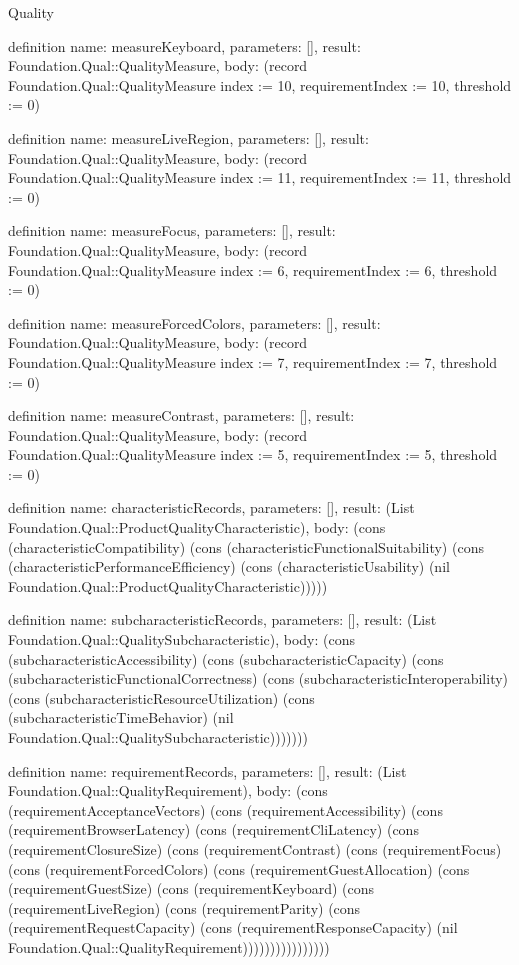 \begin{lexlean}{Quality}
\begin{semanticmodule}
definition{
  name: measureKeyboard,
  parameters: [],
  result: Foundation.Qual::QualityMeasure,
  body: (record Foundation.Qual::QualityMeasure {index := 10, requirementIndex := 10, threshold := 0})
}

definition{
  name: measureLiveRegion,
  parameters: [],
  result: Foundation.Qual::QualityMeasure,
  body: (record Foundation.Qual::QualityMeasure {index := 11, requirementIndex := 11, threshold := 0})
}

definition{
  name: measureFocus,
  parameters: [],
  result: Foundation.Qual::QualityMeasure,
  body: (record Foundation.Qual::QualityMeasure {index := 6, requirementIndex := 6, threshold := 0})
}

definition{
  name: measureForcedColors,
  parameters: [],
  result: Foundation.Qual::QualityMeasure,
  body: (record Foundation.Qual::QualityMeasure {index := 7, requirementIndex := 7, threshold := 0})
}

definition{
  name: measureContrast,
  parameters: [],
  result: Foundation.Qual::QualityMeasure,
  body: (record Foundation.Qual::QualityMeasure {index := 5, requirementIndex := 5, threshold := 0})
}

definition{
  name: characteristicRecords,
  parameters: [],
  result: (List Foundation.Qual::ProductQualityCharacteristic),
  body: (cons (characteristicCompatibility) (cons (characteristicFunctionalSuitability) (cons (characteristicPerformanceEfficiency) (cons (characteristicUsability) (nil Foundation.Qual::ProductQualityCharacteristic)))))
}

definition{
  name: subcharacteristicRecords,
  parameters: [],
  result: (List Foundation.Qual::QualitySubcharacteristic),
  body: (cons (subcharacteristicAccessibility) (cons (subcharacteristicCapacity) (cons (subcharacteristicFunctionalCorrectness) (cons (subcharacteristicInteroperability) (cons (subcharacteristicResourceUtilization) (cons (subcharacteristicTimeBehavior) (nil Foundation.Qual::QualitySubcharacteristic)))))))
}

definition{
  name: requirementRecords,
  parameters: [],
  result: (List Foundation.Qual::QualityRequirement),
  body: (cons (requirementAcceptanceVectors) (cons (requirementAccessibility) (cons (requirementBrowserLatency) (cons (requirementCliLatency) (cons (requirementClosureSize) (cons (requirementContrast) (cons (requirementFocus) (cons (requirementForcedColors) (cons (requirementGuestAllocation) (cons (requirementGuestSize) (cons (requirementKeyboard) (cons (requirementLiveRegion) (cons (requirementParity) (cons (requirementRequestCapacity) (cons (requirementResponseCapacity) (nil Foundation.Qual::QualityRequirement))))))))))))))))
}


\end{semanticmodule}
\end{lexlean}
